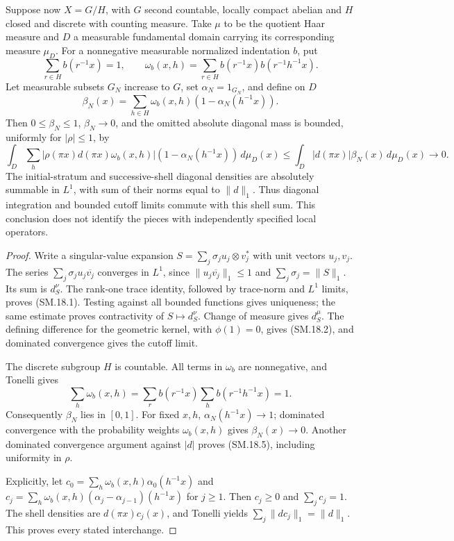 Suppose now $X=G/H$, with $G$ second countable, locally compact
abelian and $H$ closed and discrete with counting measure.
Take $\mu$ to be the quotient Haar measure and $D$ a measurable
fundamental domain carrying its corresponding measure $\mu_D$.
For a nonnegative measurable normalized indentation $b$, put
\[
 \sum_{r\in H}b(r^{-1}x)=1,\qquad
 \omega_b(x,h)=\sum_{r\in H}b(r^{-1}x)b(r^{-1}h^{-1}x).
 \tag{SM.18.3}
\]
Let measurable subsets $G_N$ increase to $G$, set
$\alpha_N=1_{G_N}$, and define on $D$
\[
 \beta_N(x)=\sum_{h\in H}\omega_b(x,h)
                       (1-\alpha_N(h^{-1}x)).
 \tag{SM.18.4}
\]
Then $0\leq\beta_N\leq1$, $\beta_N\to0$, and the omitted
absolute diagonal mass is bounded, uniformly for $|\rho|\leq1$, by
\[
 \int_D\sum_h|\rho(\pi x)d(\pi x)\omega_b(x,h)|
                 (1-\alpha_N(h^{-1}x))\,d\mu_D(x)
 \leq \int_D|d(\pi x)|\beta_N(x)\,d\mu_D(x)\longrightarrow0.
 \tag{SM.18.5}
\]
The initial-stratum and successive-shell diagonal densities
are absolutely summable in $L^1$, with sum of their norms equal
to $\|d\|_1$.  Thus diagonal integration and bounded cutoff
limits commute with this shell sum.  This conclusion does not
identify the pieces with independently specified local operators.

\begin{proof}
Write a singular-value expansion
$S=\sum_j\sigma_j u_j\otimes v_j^*$ with unit vectors $u_j,v_j$.
The series $\sum_j\sigma_j u_j\overline{v_j}$ converges in $L^1$,
since $\|u_j\overline{v_j}\|_1\leq1$ and
$\sum_j\sigma_j=\|S\|_1$.  Its sum is $d_S^\nu$.
The rank-one trace identity, followed by trace-norm and $L^1$
limits, proves (SM.18.1).  Testing against all bounded functions
gives uniqueness; the same estimate proves contractivity of
$S\mapsto d_S^\nu$.  Change of measure gives $d_S^\mu$.
The defining difference for the geometric kernel, with $\phi(1)=0$,
gives (SM.18.2), and dominated convergence gives the cutoff limit.

The discrete subgroup $H$ is countable.  All terms in $\omega_b$
are nonnegative, and Tonelli gives
\[
 \sum_h\omega_b(x,h)
 =\sum_r b(r^{-1}x)\sum_h b(r^{-1}h^{-1}x)=1.
 \tag{SM.18.6}
\]
Consequently $\beta_N$ lies in $[0,1]$.  For fixed $x,h$,
$\alpha_N(h^{-1}x)\to1$; dominated convergence with the
probability weights $\omega_b(x,h)$ gives $\beta_N(x)\to0$.
Another dominated convergence argument against $|d|$ proves
(SM.18.5), including uniformity in $\rho$.

Explicitly, let $c_0=\sum_h\omega_b(x,h)\alpha_0(h^{-1}x)$
and $c_j=\sum_h\omega_b(x,h)(\alpha_j-\alpha_{j-1})(h^{-1}x)$
for $j\geq1$.  Then $c_j\geq0$ and $\sum_jc_j=1$.
The shell densities are $d(\pi x)c_j(x)$, and Tonelli yields
$\sum_j\|dc_j\|_1=\|d\|_1$.  This proves every stated interchange.
\end{proof}

